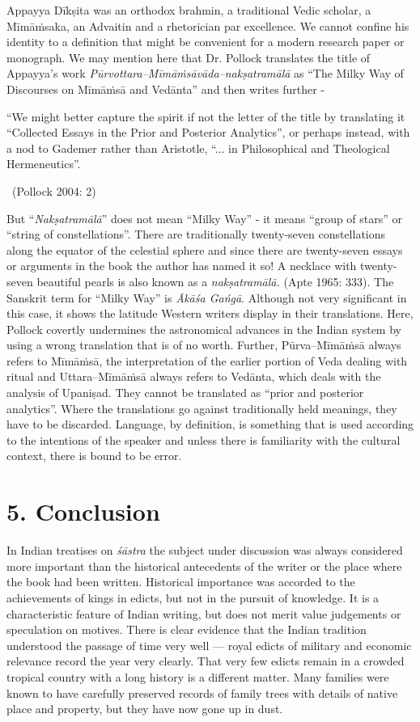Appayya Dīkṣita was an orthodox brahmin, a traditional Vedic scholar, a Mīmāṁsaka, an {Advaitin} and a rhetorician par excellence. We cannot confine his identity to a definition that might be convenient for a modern research paper or monograph. We may mention here that Dr. Pollock translates the title of Appayya’s work \textit{Pūrvottara--Mīmāṁsāvāda--nakṣatramālā} as “The Milky Way of Discourses on Mīmāṁsā and Vedānta” and then writes further -

\begin{myquote}
“We might better capture the spirit if not the letter of the title by translating it “Collected Essays in the Prior and Posterior Analytics”, or perhaps instead, with a nod to Gademer rather than Aristotle, “... in Philosophical and Theological Hermeneutics”. 

~\hfill (Pollock 2004: 2)
\end{myquote}

But “\textit{Nakṣatramālā}” does not mean “Milky Way” - it means “group of stars” or “string of constellations”. There are traditionally twenty-seven constellations along the equator of the celestial sphere and since there are twenty-seven essays or arguments in the book the author has named it so! A necklace with twenty-seven beautiful pearls is also known as a \textit{nakṣatramālā.} (Apte 1965: 333). The Sanskrit term for “Milky Way” is \textit{Ākāśa Gańgā}. Although not very significant in this case, it shows the latitude Western writers display in their translations. Here, Pollock covertly undermines the astronomical advances in the Indian system by using a wrong translation that is of no worth. Further, Pūrva--Mīmāṁsā always refers to Mīmāṁsā, the interpretation of the earlier portion of Veda dealing with ritual and Uttara--Mīmāṁsā always refers to Vedānta, which deals with the analysis of Upaniṣad. They cannot be translated as “prior and posterior analytics”. Where the translations go against traditionally held meanings, they have to be discarded. Language, by definition, is something that is used according to the intentions of the speaker and unless there is familiarity with the cultural context, there is bound to be error.


\section*{5. Conclusion}

In Indian treatises on \textit{śāstra} the subject under discussion was always considered more important than the historical antecedents of the writer or the place where the book had been written. Historical importance was accorded to the achievements of kings in edicts, but not in the pursuit of knowledge. It is a characteristic feature of Indian writing, but does not merit value judgements or speculation on motives. There is clear evidence that the Indian tradition understood the passage of time very well --- royal edicts of military and economic relevance record the year very clearly. That very few edicts remain in a crowded tropical country with a long history is a different matter. Many families were known to have carefully preserved records of family trees with details of native place and property, but they have now gone up in dust.

